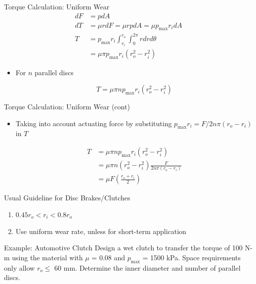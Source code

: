 \documentclass[10pt, svgnames]{beamer}
\begin{document}
\begin{frame}[label={sec:org9aed64d}]{Torque Calculation: Uniform Wear}
\begin{align*}
    dF &= pdA \\
    dT &= \mu r dF = \mu r p dA = \mu p_{\max} r_i dA \\
    T &= p_{\max} r_i \int_{r_i}^{r_o} \int_0^{2\pi} r dr d\theta \\
        &= \mu \pi p_{\max} r_i \left( r_o^2 - r_i^2 \right)
\end{align*}

\begin{itemize}
\item For \(n\) parallel discs

$$ T = \mu \pi np_{\max} r_i \left( r_o^2 - r_i^2 \right) $$
\end{itemize}
\end{frame}

\begin{frame}[label={sec:org5de2a2f}]{Torque Calculation: Uniform Wear (cont)}
\begin{itemize}
\item Taking into account actuating force by substituting \(p_{\max}r_{i} = F / 2n \pi (r_{o} - r_{i})\) in \(T\)

\begin{align*}
  T &= \mu \pi np_{\max} r_i \left( r_o^2 - r_i^2 \right) \\
    &= \mu \pi n \left( r_o^2 - r_i^2 \right) \frac{F}{2n \pi (r_{o} - r_{i})} \\
    &= \mu F \left( \frac{r_{o} + r_{i}}{2} \right)
\end{align*}
\end{itemize}
\end{frame}

\begin{frame}[label={sec:orgb47b44b}]{Usual Guideline for Disc Brakes/Clutches}
\begin{enumerate}
\item \(0.45r_o < r_i < 0.8r_o\)
\item Use uniform wear rate, unless for short-term application
\end{enumerate}
\end{frame}

\begin{frame}[label={sec:org078c82c}]{Example: Automotive Clutch}
Design a wet clutch to transfer the torque of 100 N-m using the material with \(\mu\) = 0.08 and \(p_{\max}\) = 1500 kPa. Space requirements only allow \(r_o \leqslant\) 60 mm. Determine the inner diameter and number of parallel discs.
\end{frame}
\end{document}
